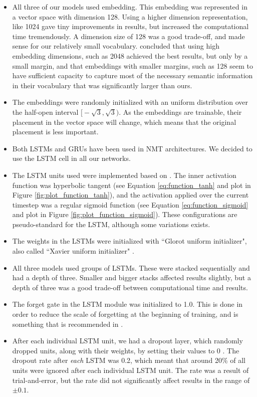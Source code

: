 \begin{itemize}
    \item All three of our models used embedding. This embedding was represented in a vector space with dimension 128. Using a higher dimension representation, like 1024 gave tiny improvements in results, but increased the computational time tremendously. A dimension size of 128 was a good trade-off, and made sense for our relatively small vocabulary. \cite{britz2017massive} concluded that using high embedding dimensions, such as 2048 achieved the best results, but only by a small margin, and that embeddings with smaller margins, such as 128 seem to have sufficient capacity to capture most of the necessary semantic information in their vocabulary that was significantly larger than ours.
    \item The embeddings were randomly initialized with an uniform distribution over the half-open interval \(\big[-\sqrt{3}, \sqrt{3}\big)\). As the embeddings are trainable, their placement in the vector space will change, which means that the original placement is less important.
    \item Both LSTMs and GRUs have been used in NMT architectures. We decided to use the LSTM cell in all our networks. 
    \item The LSTM units used were implemented based on \citep{hochreiter1997long}. The inner activation function was hyperbolic tangent (see Equation \ref{eq:function_tanh} and plot in Figure \ref{fig:plot_function_tanh}), and the activation applied over the current timestep was a regular sigmoid function (see Equation \ref{eq:function_sigmoid} and plot in Figure \ref{fig:plot_function_sigmoid}). These configurations are pseudo-standard for the LSTM, although some variations exists.
    \item The weights in the LSTMs were initialized with ``Glorot uniform initializer", also called ``Xavier uniform initializer" \citep{glorot2010understanding}.
    \item All three models used groups of LSTMs. These were stacked sequentially and had a depth of three. Smaller and bigger stacks affected results slightly, but a depth of three was a good trade-off between computational time and results.
    \item The forget gate in the LSTM module was initialized to 1.0. This is done in order to reduce the scale of forgetting at the beginning of training, and is something that is recommended in \citep{zaremba2015empirical}.
    \item After each individual LSTM unit, we had a dropout layer, which randomly dropped units, along with their weights, by setting their values to 0 \citep{srivastava2014dropout}. The dropout rate after \emph{each} LSTM was 0.2, which meant that around 20\% of all units were ignored after each individual LSTM unit. The rate was a result of trial-and-error, but the rate did not significantly affect results in the range of \(\pm 0.1\).
\end{itemize}

